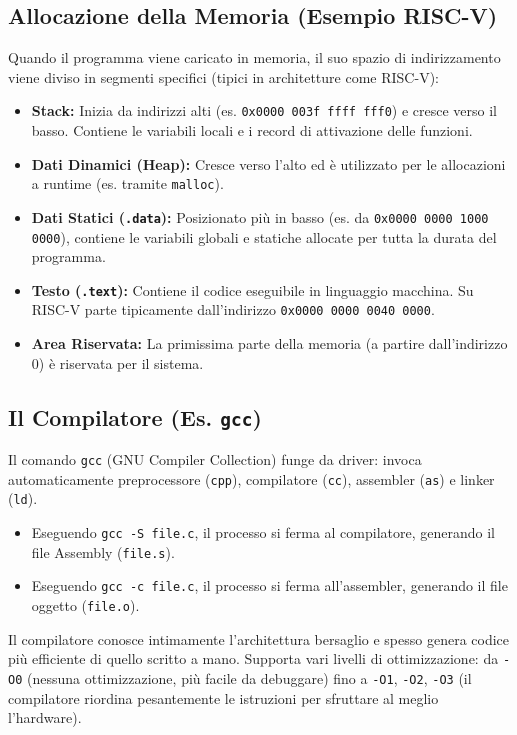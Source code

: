 \documentclass[12pt, a4paper]{article}
\begin{document}
\subsection{Allocazione della Memoria (Esempio RISC-V)}
Quando il programma viene caricato in memoria, il suo spazio di indirizzamento viene diviso in segmenti specifici (tipici in architetture come RISC-V):
\begin{itemize}
    \item \textbf{Stack:} Inizia da indirizzi alti (es. \texttt{0x0000 003f ffff fff0}) e cresce verso il basso. Contiene le variabili locali e i record di attivazione delle funzioni.
    \item \textbf{Dati Dinamici (Heap):} Cresce verso l'alto ed è utilizzato per le allocazioni a runtime (es. tramite \texttt{malloc}).
    \item \textbf{Dati Statici (\texttt{.data}):} Posizionato più in basso (es. da \texttt{0x0000 0000 1000 0000}), contiene le variabili globali e statiche allocate per tutta la durata del programma.
    \item \textbf{Testo (\texttt{.text}):} Contiene il codice eseguibile in linguaggio macchina. Su RISC-V parte tipicamente dall'indirizzo \texttt{0x0000 0000 0040 0000}.
    \item \textbf{Area Riservata:} La primissima parte della memoria (a partire dall'indirizzo 0) è riservata per il sistema.
\end{itemize}

\subsection{Il Compilatore (Es. \texttt{gcc})}
Il comando \texttt{gcc} (GNU Compiler Collection) funge da driver: invoca automaticamente preprocessore (\texttt{cpp}), compilatore (\texttt{cc}), assembler (\texttt{as}) e linker (\texttt{ld}). 
\begin{itemize}
    \item Eseguendo \texttt{gcc -S file.c}, il processo si ferma al compilatore, generando il file Assembly (\texttt{file.s}).
    \item Eseguendo \texttt{gcc -c file.c}, il processo si ferma all'assembler, generando il file oggetto (\texttt{file.o}).
\end{itemize}
Il compilatore conosce intimamente l'architettura bersaglio e spesso genera codice più efficiente di quello scritto a mano. Supporta vari livelli di ottimizzazione: da \texttt{-O0} (nessuna ottimizzazione, più facile da debuggare) fino a \texttt{-O1}, \texttt{-O2}, \texttt{-O3} (il compilatore riordina pesantemente le istruzioni per sfruttare al meglio l'hardware).
\end{document}
